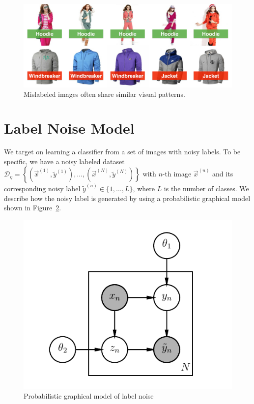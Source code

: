 \begin{figure}[t]
\begin{center}
\includegraphics[width=1.0\linewidth]{figures/noisy_labels/noise_cluster.pdf}
\end{center}
\caption{Mislabeled images often share similar visual patterns.}
\label{fig:nl-noise-cluster}
\end{figure}

\section{Label Noise Model} %
\label{sec:nl-label-noise-model}
We target on learning a classifier from a set of images with noisy labels. To be specific, we have a noisy labeled dataset $\mathcal{D}_{\eta}=\left\{\left(\vec{x}^{(1)}, \tilde{y}^{(1)}\right), \dots, \left(\vec{x}^{(N)}, \tilde{y}^{(N)}\right)\right\}$ with $n$-th image $\vec{x}^{(n)}$ and its corresponding noisy label $\tilde{y}^{(n)} \in \{1,\dots,L\}$, where $L$ is the number of classes. We describe how the noisy label is generated by using a probabilistic graphical model shown in Figure~\ref{fig:nl-noise-pgm}.

\begin{figure}[h!]
\begin{center}
\includegraphics[width=0.5\linewidth]{figures/noisy_labels/pgm.pdf}
\end{center}
\caption{Probabilistic graphical model of label noise}
\label{fig:nl-noise-pgm}
\end{figure}

